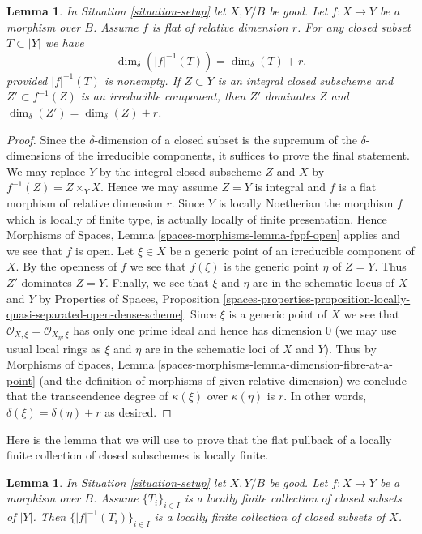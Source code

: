 \documentclass{stacks-project}
\theoremstyle{plain}
\newtheorem{lemma}[subsection]{Lemma}
\theoremstyle{definition}
\theoremstyle{remark}
\numberwithin{equation}{subsection}
\begin{document}
\begin{lemma}
\label{lemma-flat-inverse-image-dimension}
In Situation \ref{situation-setup} let $X, Y/B$ be good.
Let $f : X \to Y$ be a morphism over $B$.
Assume $f$ is flat of relative dimension $r$.
For any closed subset $T \subset |Y|$ we have
$$
\dim_\delta(|f|^{-1}(T)) = \dim_\delta(T) + r.
$$
provided $|f|^{-1}(T)$ is nonempty.
If $Z \subset Y$ is an integral closed subscheme and
$Z' \subset f^{-1}(Z)$ is an irreducible component, then
$Z'$ dominates $Z$ and $\dim_\delta(Z') = \dim_\delta(Z) + r$.
\end{lemma}

\begin{proof}
Since the $\delta$-dimension of a closed subset is the supremum of
the $\delta$-dimensions of the irreducible components, it suffices
to prove the final statement. We may replace $Y$ by the
integral closed subscheme $Z$ and $X$ by $f^{-1}(Z) = Z \times_Y X$.
Hence we may assume $Z = Y$ is integral and $f$ is a flat morphism
of relative dimension $r$. Since $Y$ is locally Noetherian the
morphism $f$ which is locally of finite type,
is actually locally of finite presentation. Hence
Morphisms of Spaces, Lemma \ref{spaces-morphisms-lemma-fppf-open}
applies and we see that $f$ is open.
Let $\xi \in X$ be a generic point of an irreducible component
of $X$. By the openness of $f$ we see that $f(\xi)$ is the
generic point $\eta$ of $Z = Y$. Thus $Z'$ dominates $Z = Y$.
Finally, we see  that $\xi$ and $\eta$ are in the schematic
locus of $X$ and $Y$ by
Properties of Spaces, Proposition
\ref{spaces-properties-proposition-locally-quasi-separated-open-dense-scheme}.
Since $\xi$ is a generic point of $X$ we see that
$\mathcal{O}_{X, \xi} = \mathcal{O}_{X_\eta, \xi}$ has only one
prime ideal and hence has dimension $0$ (we may use usual
local rings as $\xi$ and $\eta$ are in the schematic loci
of $X$ and $Y$). Thus by Morphisms of Spaces, Lemma
\ref{spaces-morphisms-lemma-dimension-fibre-at-a-point}
(and the definition of morphisms of given relative dimension)
we conclude that the transcendence
degree of $\kappa(\xi)$ over $\kappa(\eta)$ is $r$.
In other words, $\delta(\xi) = \delta(\eta) + r$ as desired.
\end{proof}

\noindent
Here is the lemma that we will use to prove that the flat pullback
of a locally finite collection of closed subschemes is locally finite.

\begin{lemma}
\label{lemma-inverse-image-locally-finite}
In Situation \ref{situation-setup} let $X, Y/B$ be good.
Let $f : X \to Y$ be a morphism over $B$.
Assume $\{T_i\}_{i \in I}$ is a locally
finite collection of closed subsets of $|Y|$.
Then $\{|f|^{-1}(T_i)\}_{i \in I}$ is a locally finite
collection of closed subsets of $X$.
\end{lemma}
\end{document}
